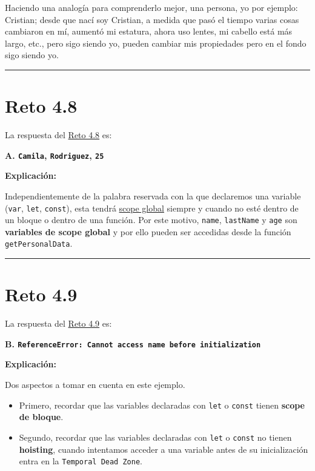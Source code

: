 \documentclass[
  letterpaper,
  DIV=11,
  numbers=noendperiod]{scrreprt}
\begin{document}
Haciendo una analogía para comprenderlo mejor, una persona, yo por
ejemplo: Cristian; desde que nací soy Cristian, a medida que pasó el
tiempo varias cosas cambiaron en mí, aumentó mi estatura, ahora uso
lentes, mi cabello está más largo, etc., pero sigo siendo yo, pueden
cambiar mis propiedades pero en el fondo sigo siendo yo.

\begin{center}\rule{0.5\linewidth}{0.5pt}\end{center}

\section{Reto 4.8}\label{sec-sol-cap4-reto8}

La respuesta del \hyperref[sec-cap4-reto8]{Reto 4.8} es:

\textbf{A. \texttt{Camila}, \texttt{Rodriguez}, \texttt{25}}

\textbf{Explicación:}

Independientemente de la palabra reservada con la que declaremos una
variable (\texttt{var}, \texttt{let}, \texttt{const}), esta tendrá
\hyperref[glos-scope_global]{scope global} siempre y cuando no esté
dentro de un bloque o dentro de una función. Por este motivo,
\texttt{name}, \texttt{lastName} y \texttt{age} son \textbf{variables de
scope global} y por ello pueden ser accedidas desde la función
\texttt{getPersonalData}.

\begin{center}\rule{0.5\linewidth}{0.5pt}\end{center}

\section{Reto 4.9}\label{sec-sol-cap4-reto9}

La respuesta del \hyperref[sec-cap4-reto9]{Reto 4.9} es:

\textbf{B.
\texttt{ReferenceError:\ Cannot\ access\ \textquotesingle{}name\textquotesingle{}\ before\ initialization}}

\textbf{Explicación:}

Dos aspectos a tomar en cuenta en este ejemplo.

\begin{itemize}
\item
  Primero, recordar que las variables declaradas con \texttt{let} o
  \texttt{const} tienen \textbf{scope de bloque}.
\item
  Segundo, recordar que las variables declaradas con \texttt{let} o
  \texttt{const} no tienen \textbf{hoisting}, cuando intentamos acceder
  a una variable antes de su inicialización entra en la
  \texttt{Temporal\ Dead\ Zone}.
\end{itemize}
\end{document}
